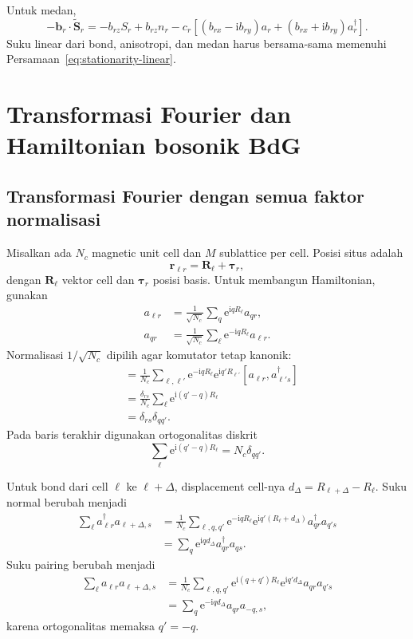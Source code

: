 \documentclass[11pt,a4paper]{article}
\newcommand{\ii}{\mathrm{i}}
\newcommand{\ee}{\mathrm{e}}
\newcommand{\vS}{\bm S}
\begin{document}
Untuk medan,
\begin{equation}
-\bm b_r\cdot\widetilde{\vS}_r
=-b_{rz}S_r+b_{rz}n_r
-c_r[(b_{rx}-\ii b_{ry})a_r+(b_{rx}+\ii b_{ry})a_r^\dagger].
\label{eq:field-expansion}
\end{equation}
Suku linear dari bond, anisotropi, dan medan harus bersama-sama memenuhi Persamaan~\eqref{eq:stationarity-linear}.

\section{Transformasi Fourier dan Hamiltonian bosonik BdG}

\subsection{Transformasi Fourier dengan semua faktor normalisasi}

Misalkan ada $N_c$ magnetic unit cell dan $M$ sublattice per cell. Posisi situs adalah
\begin{equation}
\bm r_{\ell r}=\bm R_\ell+\bm\tau_r,
\end{equation}
dengan $\bm R_\ell$ vektor cell dan $\bm\tau_r$ posisi basis. Untuk membangun Hamiltonian, gunakan
\begin{align}
a_{\ell r}&=\frac1{\sqrt{N_c}}\sum_q\ee^{\ii qR_\ell}a_{qr},\label{eq:fourier-forward}\\
a_{qr}&=\frac1{\sqrt{N_c}}\sum_\ell\ee^{-\ii qR_\ell}a_{\ell r}.
\label{eq:fourier-inverse}
\end{align}
Normalisasi $1/\sqrt{N_c}$ dipilih agar komutator tetap kanonik:
\begin{align}
[a_{qr},a_{q's}^\dagger]
&=\frac1{N_c}\sum_{\ell,\ell'}
\ee^{-\ii qR_\ell}\ee^{\ii q'R_{\ell'}}
[a_{\ell r},a_{\ell' s}^\dagger]\\
&=\frac{\delta_{rs}}{N_c}\sum_\ell
\ee^{\ii(q'-q)R_\ell}\\
&=\delta_{rs}\delta_{qq'}.
\end{align}
Pada baris terakhir digunakan ortogonalitas diskrit
\begin{equation}
\sum_\ell\ee^{\ii(q'-q)R_\ell}=N_c\delta_{qq'}.
\label{eq:fourier-orthogonality}
\end{equation}

Untuk bond dari cell $\ell$ ke $\ell+\Delta$, displacement cell-nya $d_\Delta=R_{\ell+\Delta}-R_\ell$. Suku normal berubah menjadi
\begin{align}
\sum_\ell a_{\ell r}^\dagger a_{\ell+\Delta,s}
&=\frac1{N_c}\sum_{\ell,q,q'}
\ee^{-\ii qR_\ell}\ee^{\ii q'(R_\ell+d_\Delta)}a_{qr}^\dagger a_{q's}\\
&=\sum_q\ee^{\ii qd_\Delta}a_{qr}^\dagger a_{qs}.
\label{eq:fourier-normal-bond}
\end{align}
Suku pairing berubah menjadi
\begin{align}
\sum_\ell a_{\ell r}a_{\ell+\Delta,s}
&=\frac1{N_c}\sum_{\ell,q,q'}
\ee^{\ii(q+q')R_\ell}\ee^{\ii q'd_\Delta}a_{qr}a_{q's}\\
&=\sum_q\ee^{-\ii qd_\Delta}a_{qr}a_{-q,s},
\label{eq:fourier-pair-bond}
\end{align}
karena ortogonalitas memaksa $q'=-q$.
\end{document}
